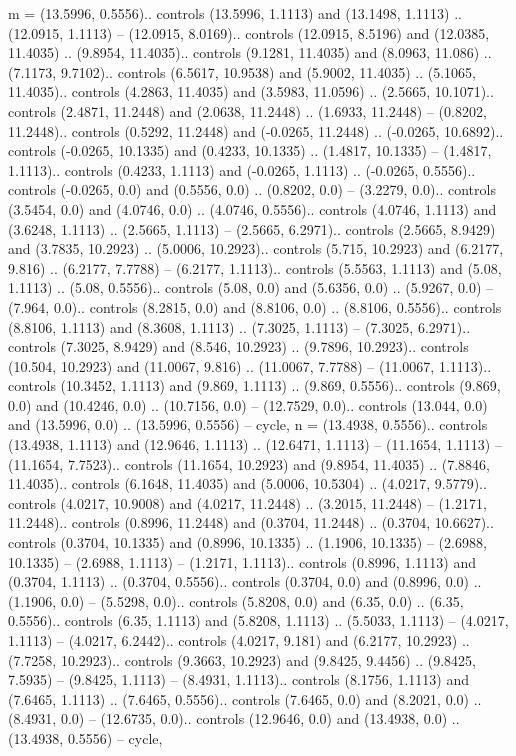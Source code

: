 {m} = {(13.5996, 0.5556).. controls (13.5996, 1.1113) and (13.1498, 1.1113) .. (12.0915, 1.1113) -- (12.0915, 8.0169).. controls (12.0915, 8.5196) and (12.0385, 11.4035) .. (9.8954, 11.4035).. controls (9.1281, 11.4035) and (8.0963, 11.086) .. (7.1173, 9.7102).. controls (6.5617, 10.9538) and (5.9002, 11.4035) .. (5.1065, 11.4035).. controls (4.2863, 11.4035) and (3.5983, 11.0596) .. (2.5665, 10.1071).. controls (2.4871, 11.2448) and (2.0638, 11.2448) .. (1.6933, 11.2448) -- (0.8202, 11.2448).. controls (0.5292, 11.2448) and (-0.0265, 11.2448) .. (-0.0265, 10.6892).. controls (-0.0265, 10.1335) and (0.4233, 10.1335) .. (1.4817, 10.1335) -- (1.4817, 1.1113).. controls (0.4233, 1.1113) and (-0.0265, 1.1113) .. (-0.0265, 0.5556).. controls (-0.0265, 0.0) and (0.5556, 0.0) .. (0.8202, 0.0) -- (3.2279, 0.0).. controls (3.5454, 0.0) and (4.0746, 0.0) .. (4.0746, 0.5556).. controls (4.0746, 1.1113) and (3.6248, 1.1113) .. (2.5665, 1.1113) -- (2.5665, 6.2971).. controls (2.5665, 8.9429) and (3.7835, 10.2923) .. (5.0006, 10.2923).. controls (5.715, 10.2923) and (6.2177, 9.816) .. (6.2177, 7.7788) -- (6.2177, 1.1113).. controls (5.5563, 1.1113) and (5.08, 1.1113) .. (5.08, 0.5556).. controls (5.08, 0.0) and (5.6356, 0.0) .. (5.9267, 0.0) -- (7.964, 0.0).. controls (8.2815, 0.0) and (8.8106, 0.0) .. (8.8106, 0.5556).. controls (8.8106, 1.1113) and (8.3608, 1.1113) .. (7.3025, 1.1113) -- (7.3025, 6.2971).. controls (7.3025, 8.9429) and (8.546, 10.2923) .. (9.7896, 10.2923).. controls (10.504, 10.2923) and (11.0067, 9.816) .. (11.0067, 7.7788) -- (11.0067, 1.1113).. controls (10.3452, 1.1113) and (9.869, 1.1113) .. (9.869, 0.5556).. controls (9.869, 0.0) and (10.4246, 0.0) .. (10.7156, 0.0) -- (12.7529, 0.0).. controls (13.044, 0.0) and (13.5996, 0.0) .. (13.5996, 0.5556) -- cycle},
{n} = {(13.4938, 0.5556).. controls (13.4938, 1.1113) and (12.9646, 1.1113) .. (12.6471, 1.1113) -- (11.1654, 1.1113) -- (11.1654, 7.7523).. controls (11.1654, 10.2923) and (9.8954, 11.4035) .. (7.8846, 11.4035).. controls (6.1648, 11.4035) and (5.0006, 10.5304) .. (4.0217, 9.5779).. controls (4.0217, 10.9008) and (4.0217, 11.2448) .. (3.2015, 11.2448) -- (1.2171, 11.2448).. controls (0.8996, 11.2448) and (0.3704, 11.2448) .. (0.3704, 10.6627).. controls (0.3704, 10.1335) and (0.8996, 10.1335) .. (1.1906, 10.1335) -- (2.6988, 10.1335) -- (2.6988, 1.1113) -- (1.2171, 1.1113).. controls (0.8996, 1.1113) and (0.3704, 1.1113) .. (0.3704, 0.5556).. controls (0.3704, 0.0) and (0.8996, 0.0) .. (1.1906, 0.0) -- (5.5298, 0.0).. controls (5.8208, 0.0) and (6.35, 0.0) .. (6.35, 0.5556).. controls (6.35, 1.1113) and (5.8208, 1.1113) .. (5.5033, 1.1113) -- (4.0217, 1.1113) -- (4.0217, 6.2442).. controls (4.0217, 9.181) and (6.2177, 10.2923) .. (7.7258, 10.2923).. controls (9.3663, 10.2923) and (9.8425, 9.4456) .. (9.8425, 7.5935) -- (9.8425, 1.1113) -- (8.4931, 1.1113).. controls (8.1756, 1.1113) and (7.6465, 1.1113) .. (7.6465, 0.5556).. controls (7.6465, 0.0) and (8.2021, 0.0) .. (8.4931, 0.0) -- (12.6735, 0.0).. controls (12.9646, 0.0) and (13.4938, 0.0) .. (13.4938, 0.5556) -- cycle},
